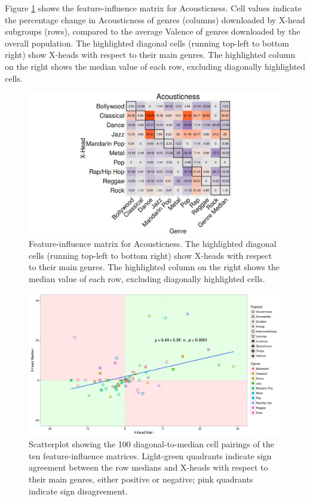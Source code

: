 \documentclass[a4paper]{article}
\begin{document}
Figure \ref{LF_Matrix_Val} shows the feature-influence matrix for Acousticness. Cell values indicate the percentage change in Acousticness of genres (columns) downloaded by X-head subgroups (rows), compared to the average Valence of genres downloaded by the overall population. The highlighted diagonal cells (running top-left to bottom right) show X-heads with respect to their main genres. The highlighted column on the right shows the median value of each row, excluding diagonally highlighted cells. 

\begin{figure}[h!]
\centering
\includegraphics[width=\linewidth]{Acousticness}
\caption[Acousticness-influence matrix]{Feature-influence matrix for Acousticness. The highlighted diagonal cells (running top-left to bottom right) show X-heads with respect to their main genres. The highlighted column on the right shows the median value of each row, excluding diagonally highlighted cells.} 
\label{LF_Matrix_Val}
\end{figure}

\begin{figure}[h!]
\centering
\includegraphics[width=\linewidth]{xScatter5}
\caption[Median-to-main Scatterplot]{Scatterplot showing the 100 diagonal-to-median cell pairings of the ten feature-influence matrices. Light-green quadrants indicate sign agreement between the row medians and X-heads with respect to their main genres, either positive or negative; pink quadrants indicate sign disagreement.}
\label{LF_Matrix_Scatter}
\end{figure}
\end{document}

